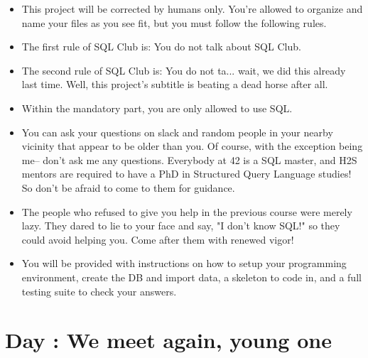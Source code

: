 \documentclass{42-en}
\begin{document}
	\begin{itemize}\itemsep1pt 
		\item This project will be corrected by humans only. 
			You're allowed to organize and name your files as you see 
			fit, but you must follow the following rules. 
		\item The first rule of SQL Club is: You do not talk about SQL Club.
		\item The second rule of SQL Club is: You do not ta... wait, we did this already last time. 
			Well, this project's subtitle is beating a dead horse after all. 
		\item Within the mandatory part, you are only allowed to use SQL. 
		\item You can ask your questions on slack and random people in your nearby vicinity 
			that appear to be older than you. Of course, with the exception being me-- don't ask me 
			any questions. Everybody at 42 is a SQL master, and H2S mentors are required 
			to have a PhD in Structured Query Language studies! So don't be afraid to 
			come to them for guidance.
		\item The people who refused to give you help in the previous course were merely lazy. They dared to lie to your 
			face and say, "I don't know SQL!" so they could avoid helping you. Come after them with renewed vigor! 
		\item You will be provided with instructions on how to setup your programming environment, create the DB 
			and import data, a skeleton to code in, and a full testing suite to check your answers.
	\end{itemize}

\startexercices


\chapter{Day \exercicenumber: We meet again, young one }

\makeheaderfiles
\end{document}
